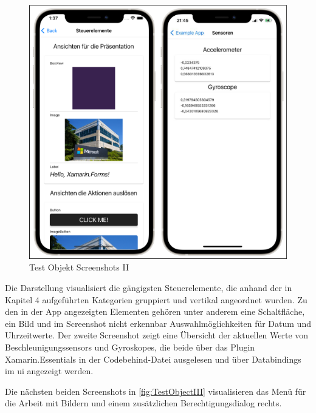 \begin{figure}[!ht]
 \includegraphics[width=\textwidth,keepaspectratio]{Images/Screenshot/Sensors.png}
 \caption{Test Objekt Screenshots II}
 \label{fig:TestObjectII}
\end{figure}
Die Darstellung visualisiert die gängigsten Steuerelemente,  die anhand der in Kapitel 4 aufgeführten Kategorien gruppiert und vertikal angeordnet wurden.  Zu den in der App angezeigten Elementen gehören unter anderem eine Schaltfläche,  ein Bild und im Screenshot nicht erkennbar Auswahlmöglichkeiten für Datum und Uhrzeitwerte.  Der zweite Screenshot zeigt eine Übersicht der aktuellen Werte von Beschleunigungssensors und  Gyroskopes,  die beide über das Plugin Xamarin.Essentials in der Codebehind-Datei ausgelesen und über Databindings im \ac{ui} angezeigt werden.    

Die nächsten beiden Screenshots in \ref{fig:TestObjectIII} visualisieren das Menü für die Arbeit mit Bildern und einem zusätzlichen Berechtigungsdialog rechts.

